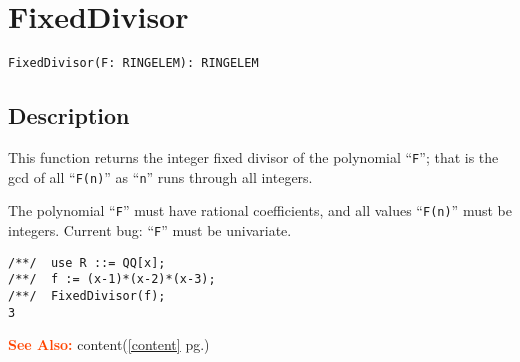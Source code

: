 \documentclass[a4paper]{mybook}
\newenvironment{command}{}{} %
\newcommand\SeeAlso{\par\textcolor{OrangeRed}{\textbf{\large See Also: }}}
\begin{document}
\section{FixedDivisor}
\label{FixedDivisor}
\begin{command} %


\begin{Verbatim}[label=syntax, rulecolor=\color{MidnightBlue},
frame=single]
FixedDivisor(F: RINGELEM): RINGELEM
\end{Verbatim}


\subsection*{Description}

This function returns the integer fixed divisor of the polynomial ``\verb&F&'';
that is the gcd of all ``\verb&F(n)&'' as ``\verb&n&'' runs through all integers.
\par 
The polynomial ``\verb&F&'' must have rational coefficients, and all values
``\verb&F(n)&'' must be integers.  Current bug: ``\verb&F&'' must be univariate.
\begin{Verbatim}[label=example, rulecolor=\color{PineGreen}, frame=single]
/**/  use R ::= QQ[x];
/**/  f := (x-1)*(x-2)*(x-3);
/**/  FixedDivisor(f);
3
\end{Verbatim}


\SeeAlso %
  content(\ref{content} pg.\pageref{content})
\end{command} %
\end{document}
